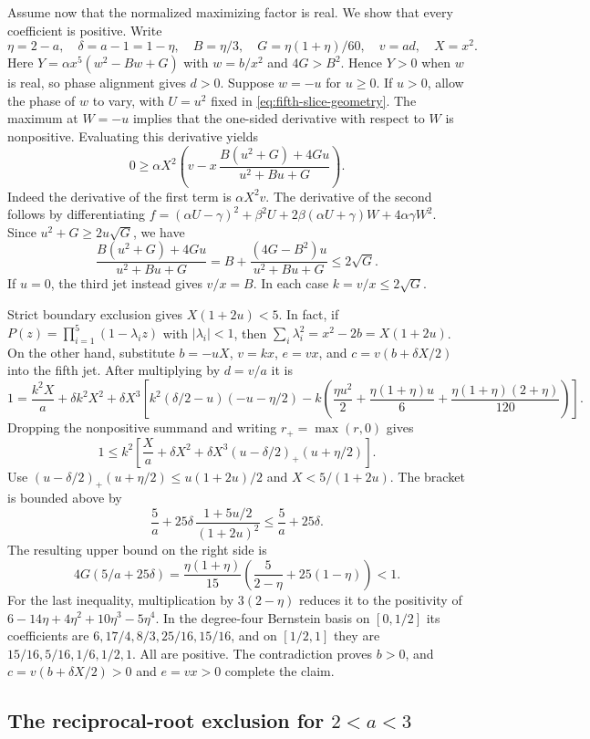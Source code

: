 \documentclass[11pt]{article}
\begin{document}
Assume now that the normalized maximizing factor is real. We show
that every coefficient is positive. Write
\[
 \eta=2-a,\quad \delta=a-1=1-\eta,\quad
 B=\eta/3,\quad G=\eta(1+\eta)/60,\quad v=ad,\quad X=x^2.
\]
Here \(Y=\alpha x^5(w^2-Bw+G)\) with \(w=b/x^2\) and
\(4G>B^2\). Hence \(Y>0\) when \(w\) is real, so phase
alignment gives \(d>0\).
Suppose \(w=-u\) for \(u\geq0\). If \(u>0\), allow the phase
of \(w\) to vary, with \(U=u^2\) fixed in
\eqref{eq:fifth-slice-geometry}. The maximum at \(W=-u\)
implies that the one-sided derivative with respect to \(W\)
is nonpositive. Evaluating this derivative yields
\[
 0\geq \alpha X^2\left(
 v-x\,\frac{B(u^2+G)+4Gu}{u^2+Bu+G}\right).
\]
Indeed the derivative of the first term is \(\alpha X^2 v\).
The derivative of the second follows by differentiating
\(f=(\alpha U-\gamma)^2+\beta^2U+
 2\beta(\alpha U+\gamma)W+4\alpha\gamma W^2\).
Since \(u^2+G\geq2u\sqrt G\), we have
\[
 \frac{B(u^2+G)+4Gu}{u^2+Bu+G}
 =B+\frac{(4G-B^2)u}{u^2+Bu+G}\leq 2\sqrt G.
\]
If \(u=0\), the third jet instead gives \(v/x=B\).
In each case \(k=v/x\leq2\sqrt G\).

Strict boundary exclusion gives \(X(1+2u)<5\). In fact, if
\(P(z)=\prod_{i=1}^5(1-\lambda_i z)\) with \(|\lambda_i|<1\),
then \(\sum_i\lambda_i^2=x^2-2b=X(1+2u)\).
On the other hand, substitute \(b=-uX\), \(v=kx\),
\(e=vx\), and \(c=v(b+\delta X/2)\) into the fifth jet.
After multiplying by \(d=v/a\) it is
\[
 1=\frac{k^2X}{a}+\delta k^2X^2+
 \delta X^3\left[
 k^2(\delta/2-u)(-u-\eta/2)
 -k\left(\frac{\eta u^2}{2}
        +\frac{\eta(1+\eta)u}{6}
        +\frac{\eta(1+\eta)(2+\eta)}{120}\right)\right].
\]
Dropping the nonpositive summand and writing \(r_+=\max(r,0)\)
gives
\[
 1\leq k^2\left[\frac{X}{a}+\delta X^2+
         \delta X^3(u-\delta/2)_+(u+\eta/2)\right].
\]
Use \((u-\delta/2)_+(u+\eta/2)\leq u(1+2u)/2\) and
\(X<5/(1+2u)\). The bracket is bounded above by
\[
 \frac5a+25\delta\,\frac{1+5u/2}{(1+2u)^2}
 \leq \frac5a+25\delta .
\]
The resulting upper bound on the right side is
\[
 4G(5/a+25\delta)
 =\frac{\eta(1+\eta)}{15}
      \left(\frac5{2-\eta}+25(1-\eta)\right)<1.
\]
For the last inequality, multiplication by \(3(2-\eta)\)
reduces it to the positivity of
\(6-14\eta+4\eta^2+10\eta^3-5\eta^4\).
In the degree-four Bernstein basis on \([0,1/2]\) its coefficients
are \(6,17/4,8/3,25/16,15/16\), and on \([1/2,1]\) they are
\(15/16,5/16,1/6,1/2,1\). All are positive. The contradiction
proves \(b>0\), and \(c=v(b+\delta X/2)>0\) and \(e=vx>0\)
complete the claim.


\subsection{The reciprocal-root exclusion for \texorpdfstring{\(2<a<3\)}{2<a<3}}
\end{document}
